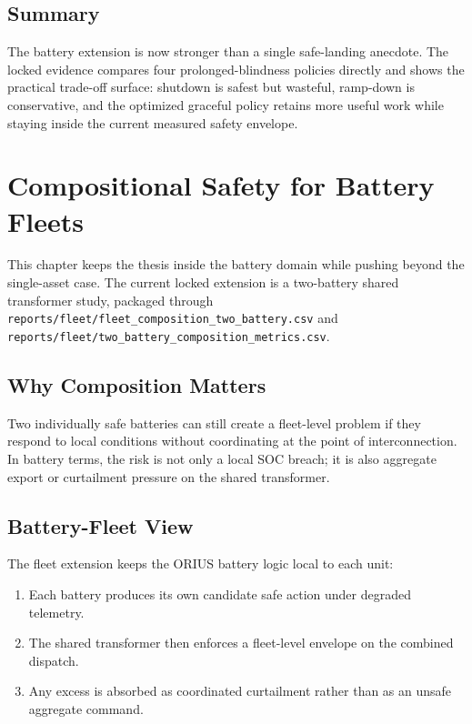 \subsection{Summary}

The battery extension is now stronger than a single safe-landing anecdote.
The locked evidence compares four prolonged-blindness policies directly and
shows the practical trade-off surface: shutdown is safest but wasteful,
ramp-down is conservative, and the optimized graceful policy retains more
useful work while staying inside the current measured safety envelope.


\section{Compositional Safety for Battery Fleets}
\label{ch:compositional-safety-fleets}

This chapter keeps the thesis inside the battery domain while pushing beyond
the single-asset case.  The current locked extension is a two-battery shared
transformer study, packaged through
\texttt{reports/fleet/fleet\_composition\_two\_battery.csv} and
\texttt{reports/fleet/two\_battery\_composition\_metrics.csv}.

\subsection{Why Composition Matters}

Two individually safe batteries can still create a fleet-level problem if
they respond to local conditions without coordinating at the point of
interconnection.  In battery terms, the risk is not only a local SOC breach;
it is also aggregate export or curtailment pressure on the shared transformer.

\subsection{Battery-Fleet View}

The fleet extension keeps the ORIUS battery logic local to each unit:

\begin{enumerate}
  \item Each battery produces its own candidate safe action under degraded
    telemetry.
  \item The shared transformer then enforces a fleet-level envelope on the
    combined dispatch.
  \item Any excess is absorbed as coordinated curtailment rather than as an
    unsafe aggregate command.
\end{enumerate}

